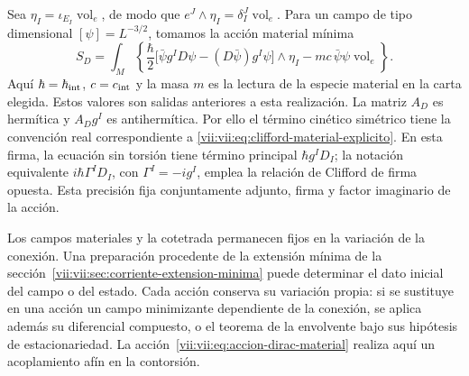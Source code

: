 Sea \(\eta_I=\iota_{E_I}\operatorname{vol}_e\), de modo que
\(e^J\wedge\eta_I=\delta_I^J\operatorname{vol}_e\). Para un
campo de tipo dimensional \([\psi]=L^{-3/2}\), tomamos la acción
material mínima
\begin{equation}
 S_D=\int_M\left\{
 \frac{\hbar}{2}
 \bigl[\bar\psi g^I D\psi-(D\bar\psi)g^I\psi\bigr]\wedge\eta_I
 -mc\,\bar\psi\psi\operatorname{vol}_e\right\}.
 \label{vii:vii:eq:accion-dirac-material}
\end{equation}
Aquí \(\hbar=\hbar_{\rm int}\), \(c=c_{\rm int}\) y la masa
\(m\) es la lectura de la especie material en la carta elegida.
Estos valores son salidas anteriores a esta realización. La matriz
\(A_D\) es hermítica y \(A_Dg^I\) es antihermítica. Por ello el
término cinético simétrico tiene la convención real correspondiente a
\eqref{vii:vii:eq:clifford-material-explicito}. En esta firma, la ecuación
sin torsión tiene término principal \(\hbar g^I D_I\); la notación
equivalente \(i\hbar\Gamma^I D_I\), con \(\Gamma^I=-i g^I\),
emplea la relación de Clifford de firma opuesta. Esta precisión fija
conjuntamente adjunto, firma y factor imaginario de la acción.

Los campos materiales y la cotetrada permanecen fijos en la variación
de la conexión. Una preparación procedente de la extensión mínima de
la sección~\ref{vii:vii:sec:corriente-extension-minima} puede determinar
el dato inicial del campo o del estado. Cada acción conserva su
variación propia: si se sustituye en una acción un campo minimizante
dependiente de la conexión, se aplica además su diferencial compuesto,
o el teorema de la envolvente bajo sus hipótesis de estacionariedad.
La acción~\eqref{vii:vii:eq:accion-dirac-material} realiza aquí un
acoplamiento afín en la contorsión.

